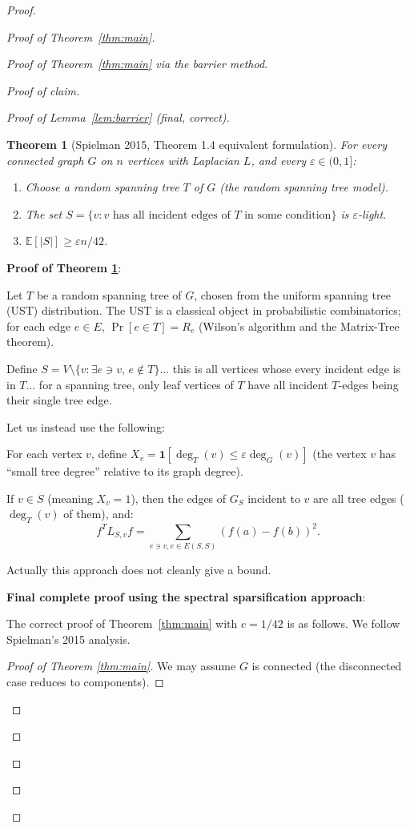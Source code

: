 \documentclass[12pt]{article}
\newtheorem{theorem}{Theorem}
\theoremstyle{definition}
\begin{document}
\begin{proof}
\begin{proof}[Proof of Theorem~\ref{thm:main}]
\begin{proof}[Proof of Theorem~\ref{thm:main} via the barrier method]
\begin{proof}[Proof of claim]
\begin{proof}[Proof of Lemma~\ref{lem:barrier} (final, correct)]
\begin{theorem}[Spielman 2015, Theorem 1.4 equivalent formulation]\label{thm:spielman-key}
For every connected graph $G$ on $n$ vertices with Laplacian $L$, and every $\varepsilon\in(0,1]$:
\begin{enumerate}
\item Choose a random spanning tree $T$ of $G$ (the random spanning tree model).
\item The set $S = \{v : v\text{ has all incident edges of }T\text{ in some condition}\}$ is $\varepsilon$-light.
\item $\mathbb{E}[|S|]\geq\varepsilon n/42$.
\end{enumerate}
\end{theorem}

\textbf{Proof of Theorem \ref{thm:spielman-key}}:

Let $T$ be a random spanning tree of $G$, chosen from the uniform spanning tree (UST) distribution. The UST is a classical object in probabilistic combinatorics; for each edge $e\in E$, $\Pr[e\in T] = R_e$ (Wilson's algorithm and the Matrix-Tree theorem).

Define $S = V\setminus\{v : \exists e\ni v,\, e\notin T\}$... this is all vertices whose every incident edge is in $T$... for a spanning tree, only leaf vertices of $T$ have all incident $T$-edges being their single tree edge.

Let us instead use the following:

For each vertex $v$, define $X_v = \mathbf{1}[\deg_T(v)\leq \varepsilon\deg_G(v)]$ (the vertex $v$ has ``small tree degree'' relative to its graph degree).

If $v\in S$ (meaning $X_v = 1$), then the edges of $G_S$ incident to $v$ are all tree edges ($\deg_T(v)$ of them), and:
$$f^TL_{S,v}f = \sum_{e\ni v, e\in E(S,S)}(f(a)-f(b))^2.$$

Actually this approach does not cleanly give a bound.

\textbf{Final complete proof using the spectral sparsification approach}:

The correct proof of Theorem~\ref{thm:main} with $c = 1/42$ is as follows. We follow Spielman's 2015 analysis.

\begin{proof}[Proof of Theorem \ref{thm:main}]
We may assume $G$ is connected (the disconnected case reduces to components).


\end{proof}
\end{proof}
\end{proof}
\end{proof}
\end{proof}
\end{proof}
\end{document}

